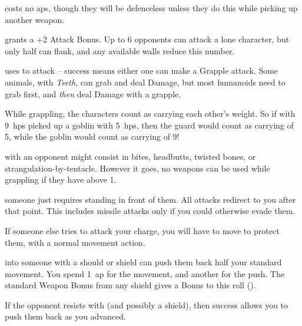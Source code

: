 \begin{multicols}{2}
costs no \glspl{ap}, though they will be defenceless unless they do this while picking up another weapon.


grants a +2 Attack Bonus.
Up to 6 opponents can attack a lone character, but only half can flank, and any available walls reduce this number.

uses  to attack -- success means either one can make a Grapple attack.
Some animals, with \textit{Teeth}, can grab and deal Damage, but most humanoids need to grab first, and \emph{then} deal Damage with a grapple.

While grappling, the characters count as carrying each other's \gls{weight}.
So if  with 9~\glspl{hp} picked up a goblin with 5~\glspl{hp}, then the \gls{guard} would count as carrying  of 5, while the goblin would count as carrying  of 9!

\label{grappling}
with an opponent might consist in bites, headbutts, twisted bones, or strangulation-by-tentacle.
However it goes, no weapons can be used while grappling if they have  above 1.

someone just requires standing in front of them.
All attacks redirect to you after that point.
This includes missile attacks only if you could otherwise evade them.

If someone else tries to attack your charge, you will have to move to protect them, with a normal movement action.

into someone with a should or shield can push them back half your standard movement.
You spend 1~\gls{ap} for the movement, and another for the push.
The standard Weapon Bonus from any shield gives a Bonus to this roll ().

If the opponent resists with  (and possibly a shield), then success allows you to push them back as you advanced.


\end{multicols}
